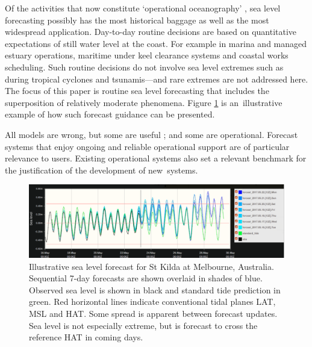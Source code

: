 Of the activities that now constitute `operational oceanography' \cite{Bell:2009uv}, sea level forecasting possibly has the most historical baggage as well as the most widespread application.
Day-to-day routine decisions are based on quantitative expectations of still water level \cite{Pugh:2014di} at the coast.  
For example in marina and managed estuary operations, maritime under keel clearance systems and coastal works scheduling. 
Such routine decisions do not involve sea level extremes such as during tropical cyclones and tsunamis---and rare extremes are not addressed here. 
The focus of this paper is routine sea level forecasting that includes the superposition of relatively moderate phenomena.
Figure \ref{fig:fc_eg} is an~illustrative example of how such forecast guidance can be presented. 


All models are wrong, but some are useful \cite{Box:1979wz}; and some are operational.        %
Forecast systems that enjoy ongoing and reliable operational support are of particular relevance to users.
Existing operational systems also set a relevant benchmark for the justification of the development of new~systems.  

\begin{figure}[H]
\centering
\includegraphics[width=1\textwidth]{figures/plots/forecast_eg.png}
\caption{Illustrative sea level forecast for St Kilda at Melbourne, Australia.  Sequential 7-day forecasts are shown overlaid in shades of blue.  Observed sea level is shown in black and standard tide prediction in green.  Red horizontal lines indicate conventional tidal planes LAT, MSL and HAT.  Some spread is apparent between forecast updates.  Sea level is not especially extreme, but is forecast to cross the reference HAT in coming days.}
\label{fig:fc_eg}
\end{figure}   


